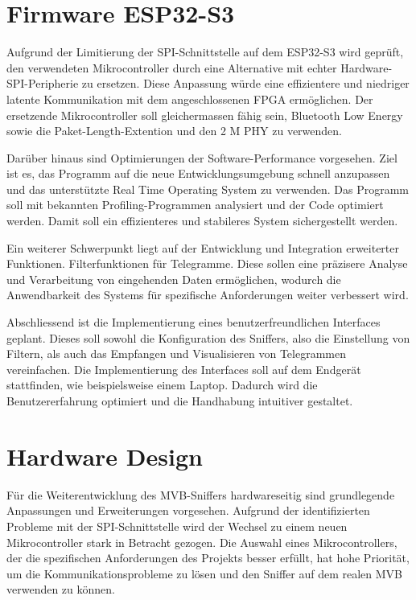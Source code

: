 \section{Firmware ESP32-S3}
\label{sec:AusblickFirmwareESP32}
Aufgrund der Limitierung der SPI-Schnittstelle auf dem ESP32-S3 wird geprüft, den verwendeten Mikrocontroller durch eine Alternative mit echter Hardware-SPI-Peripherie zu ersetzen. Diese Anpassung würde eine effizientere und niedriger latente Kommunikation mit dem angeschlossenen FPGA ermöglichen. Der ersetzende Mikrocontroller soll gleichermassen fähig sein, Bluetooth Low Energy sowie die Paket-Length-Extention und den 2 M PHY zu verwenden.

Darüber hinaus sind Optimierungen der Software-Performance vorgesehen. Ziel ist es, das Programm auf die neue Entwicklungsumgebung schnell anzupassen und das unterstützte Real Time Operating System zu verwenden. Das Programm soll mit bekannten Profiling-Programmen analysiert und der Code optimiert werden. Damit soll ein effizienteres und stabileres System sichergestellt werden.

Ein weiterer Schwerpunkt liegt auf der Entwicklung und Integration erweiterter Funktionen. Filterfunktionen für Telegramme. Diese sollen eine präzisere Analyse und Verarbeitung von eingehenden Daten ermöglichen, wodurch die Anwendbarkeit des Systems für spezifische Anforderungen weiter verbessert wird.

Abschliessend ist die Implementierung eines benutzerfreundlichen Interfaces geplant. Dieses soll sowohl die Konfiguration des Sniffers, also die Einstellung von Filtern, als auch das Empfangen und Visualisieren von Telegrammen vereinfachen. Die Implementierung des Interfaces soll auf dem Endgerät stattfinden, wie beispielsweise einem Laptop. Dadurch wird die Benutzererfahrung optimiert und die Handhabung intuitiver gestaltet.




\section{Hardware Design}
\label{sec:AusblickHardware}
Für die Weiterentwicklung des MVB-Sniffers hardwareseitig sind grundlegende Anpassungen und Erweiterungen vorgesehen. Aufgrund der identifizierten Probleme mit der SPI-Schnittstelle wird der Wechsel zu einem neuen Mikrocontroller stark in Betracht gezogen. Die Auswahl eines Mikrocontrollers, der die spezifischen Anforderungen des Projekts besser erfüllt, hat hohe Priorität, um die Kommunikationsprobleme zu lösen und den Sniffer auf dem realen MVB verwenden zu können.

